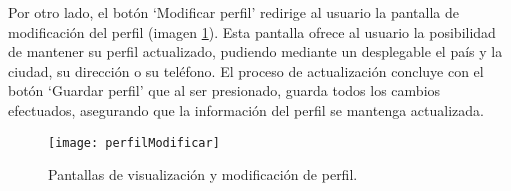 Por otro lado, el botón `Modificar perfil' redirige al usuario la pantalla de modificación del perfil (imagen \ref{img:perfilModificar}).
Esta pantalla ofrece al usuario la posibilidad de mantener su perfil actualizado, pudiendo mediante un desplegable el país y la ciudad, su dirección o su teléfono.
El proceso de actualización concluye con el botón `Guardar perfil' que al ser presionado, guarda todos los cambios efectuados, asegurando que la información del perfil se mantenga actualizada.


\begin{figure}[h]
	\label{img:perfilModificar}
	\centering
	\texttt{[image: perfilModificar]}
	\caption[Pantallas perfil y modificación perfil]{Pantallas de visualización y modificación de perfil.}
\end{figure}




